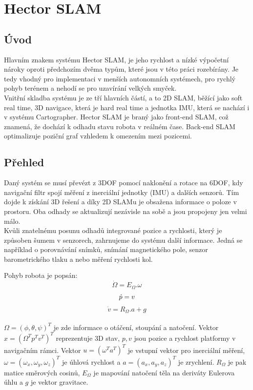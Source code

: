 \documentclass[12pt]{article}
\begin{document}
\newpage

\section{Hector SLAM}

\subsection{Úvod}
Hlavním znakem systému Hector SLAM, je jeho rychlost a nízké výpočetní nároky oproti předchozím dvěma typům, které jsou v této práci rozebírány. Je tedy vhodný pro implementaci v menších autonomních systémech, pro rychlý pohyb terénem a nehodí se pro uzavírání velkých smyček.\\
\indent Vnitřní skladba systému je ze tří hlavních částí, a to 2D SLAM, běžící jako soft real time, 3D navigace, která je hard real time a jednotka IMU, která se nachází i v systému Cartographer. Hector SLAM je braný jako front-end SLAM, což znamená, že dochází k odhadu stavu robota v reálném čase. Back-end SLAM optimalizuje poziční graf vzhledem k omezením mezi pozicemi.

\subsection{Přehled}
Daný systém se musí převézt z 3DOF pomocí naklonění a rotace na 6DOF, kdy navigační filtr spojí měření z inerciální jednotky (IMU) a dalších senzorů. Tím dojde k získání 3D řešení a díky 2D SLAMu je obsažena informace o poloze v prostoru. Oba odhady se aktualizují nezávisle na sobě a jsou propojeny jen velmi málo.\\
\indent Kvůli znatelnému posunu odhadů integrované pozice a rychlosti, který je způsoben šumem v senzorech, zahrnujeme do systému další informace. Jedná se například o porovnávání snímků, snímání magnetického pole, senzor barometrického tlaku a nebo měření rychlosti kol.

Pohyb robota je popsán:
\begin{equation}
	\dot{\Omega}=E_\Omega.\omega
\end{equation}
\begin{equation}
	\dot{p}=v\\
\end{equation}
\begin{equation}
	\dot{v}=R_\Omega.a+g
\end{equation}\\
$\Omega=(\phi,\theta,\psi)^T$ je zde informace o otáčení, stoupání a natočení. Vektor $x=(\Omega^T p^T v^T)^T$ reprezentuje 3D stav, $p,v$ jsou pozice a rychlost platformy v navigačním rámci. Vektor $u=(\omega^T a^T)^T$ je vstupní vektor pro inerciální měření, $\omega=(\omega_x,\omega_y,\omega_z)^T$ je úhlová rychlost a $a=(a_x,a_y,a_z)^T$ je zrychlení. $R_\Omega$ je pak matice směrových cosinů, $E_\Omega$ je mapování natočení těla na deriváty Eulerova úhlu a $g$ je vektor gravitace.\\
\end{document}
